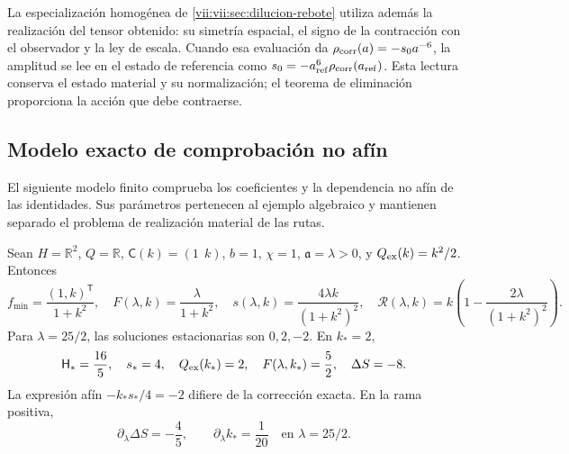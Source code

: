 La especialización homogénea de
\ref{vii:vii:sec:dilucion-rebote} utiliza además la realización del
tensor obtenido: su simetría espacial, el signo de la contracción
con el observador y la ley de escala. Cuando esa evaluación da
\(\rho_{\rm corr}(a)=-s_0a^{-6}\), la amplitud se lee en el
estado de referencia como
\(s_0=-a_{\rm ref}^{6}\rho_{\rm corr}(a_{\rm ref})\).
Esta lectura conserva el estado material y su normalización; el
teorema de eliminación proporciona la acción que debe contraerse.

\subsection{Modelo exacto de comprobación no afín}
\label{vii:vii:subsec:control-no-afin}

El siguiente modelo finito comprueba los coeficientes y la
dependencia no afín de las identidades. Sus parámetros pertenecen
al ejemplo algebraico y mantienen separado el problema de
realización material de las rutas.

\begin{proposition}
\label{vii:vii:prop:ejemplo-no-afin}
Sean \(H=\mathbb R^2\), \(Q=\mathbb R\),
\(\mathsf C(k)=(1\ \ k)\), \(b=1\), \(\chi=1\),
\(\mathfrak a=\lambda>0\), y \(Q_{\rm ex}(k)=k^2/2\).
Entonces
\begin{equation}
 f_{\min}=\frac{(1,k)^{\mathsf T}}{1+k^2},\quad
 F(\lambda,k)=\frac{\lambda}{1+k^2},\quad
 s(\lambda,k)=\frac{4\lambda k}{(1+k^2)^2},\quad
 \mathcal R(\lambda,k)
    =k\left(1-\frac{2\lambda}{(1+k^2)^2}\right).
 \label{vii:vii:eq:ejemplo-minimo-no-afin}
\end{equation}
Para \(\lambda=25/2\), las soluciones estacionarias son
\(0,2,-2\). En \(k_*=2\),
\begin{equation}
 \mathsf H_*=\frac{16}{5},\quad s_*=4,\quad
 Q_{\rm ex}(k_*)=2,\quad F(\lambda,k_*)=\frac52,
 \quad \Delta S=-8.
 \label{vii:vii:eq:valores-ejemplo-no-afin}
\end{equation}
La expresión afín \(-k_*s_*/4=-2\) difiere de la corrección
exacta. En la rama positiva,
\begin{equation}
 \partial_\lambda\Delta S=-\frac45,
 \qquad \partial_\lambda k_* =\frac1{20}
 \quad\text{en }\lambda=25/2.
 \label{vii:vii:eq:derivadas-ejemplo-no-afin}
\end{equation}
\end{proposition}

